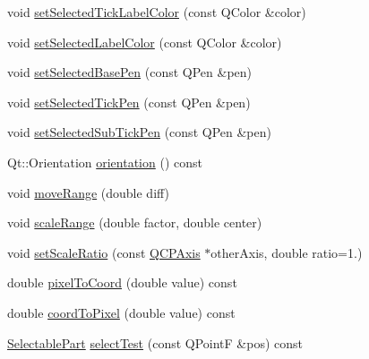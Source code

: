 \begin{DoxyCompactItemize}
\item 
void \hyperlink{classQCPAxis_a9bdbf5e63ab15187f3a1de9440129227}{set\-Selected\-Tick\-Label\-Color} (const Q\-Color \&color)
\item 
void \hyperlink{classQCPAxis_a5d502dec597c634f491fdd73d151c72d}{set\-Selected\-Label\-Color} (const Q\-Color \&color)
\item 
void \hyperlink{classQCPAxis_aeb917a909215605b95ef2be843de1ee8}{set\-Selected\-Base\-Pen} (const Q\-Pen \&pen)
\item 
void \hyperlink{classQCPAxis_a8360502685eb782edbf04019c9345cdc}{set\-Selected\-Tick\-Pen} (const Q\-Pen \&pen)
\item 
void \hyperlink{classQCPAxis_a2a00a7166600155eac26843132eb9576}{set\-Selected\-Sub\-Tick\-Pen} (const Q\-Pen \&pen)
\item 
Qt\-::\-Orientation \hyperlink{classQCPAxis_a57483f2f60145ddc9e63f3af53959265}{orientation} () const 
\item 
void \hyperlink{classQCPAxis_a18f3a68f2b691af1fd34b6593c886630}{move\-Range} (double diff)
\item 
void \hyperlink{classQCPAxis_a7072ff96fe690148f1bbcdb4f773ea1c}{scale\-Range} (double factor, double center)
\item 
void \hyperlink{classQCPAxis_af4bbd446dcaee5a83ac30ce9bcd6e125}{set\-Scale\-Ratio} (const \hyperlink{classQCPAxis}{Q\-C\-P\-Axis} $\ast$other\-Axis, double ratio=1.)
\item 
double \hyperlink{classQCPAxis_ae9289ef7043b9d966af88eaa95b037d1}{pixel\-To\-Coord} (double value) const 
\item 
double \hyperlink{classQCPAxis_a985ae693b842fb0422b4390fe36d299a}{coord\-To\-Pixel} (double value) const 
\item 
\hyperlink{classQCPAxis_abee4c7a54c468b1385dfce2c898b115f}{Selectable\-Part} \hyperlink{classQCPAxis_a940be5ef61f4fa0dc21e4f4c7a5875c2}{select\-Test} (const Q\-Point\-F \&pos) const 
\end{DoxyCompactItemize}
